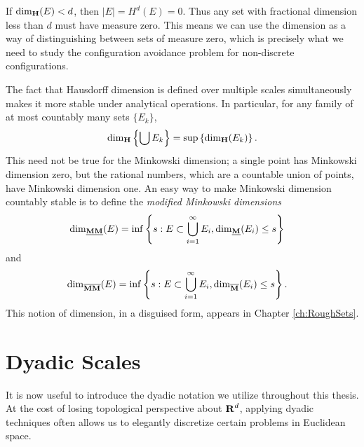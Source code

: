 \begin{remark}
	If $\operatorname{\dim_{\mathbf{H}}}(E) < d$, then $|E| = H^d(E) = 0$. Thus any set with fractional dimension less than $d$ must have measure zero. This means we can use the dimension as a way of distinguishing between sets of measure zero, which is precisely what we need to study the configuration avoidance problem for non-discrete configurations.
\end{remark}

The fact that Hausdorff dimension is defined over multiple scales simultaneously makes it more stable under analytical operations. In particular, for any family of at most countably many sets $\{ E_k \}$,
%
\[ \operatorname{\dim_{\mathbf{H}}} \left\{ \bigcup E_k \right\} = \sup \left\{ \operatorname{\dim_{\mathbf{H}}}(E_k) \right\}. \]
%
This need not be true for the Minkowski dimension; a single point has Minkowski dimension zero, but the rational numbers, which are a countable union of points, have Minkowski dimension one. An easy way to make Minkowski dimension countably stable is to define the \emph{modified Minkowski dimensions}
%
\begin{align*}
	\operatorname{\dim_{\underline{\mathbf{MM}}}}(E) &= \inf \left\{ s : E \subset \bigcup_{i = 1}^\infty E_i, \operatorname{\dim_{\underline{\mathbf{M}}}}(E_i) \leq s \right\}
\end{align*}
%
and
%
\begin{align*}
	\operatorname{\dim_{\overline{\mathbf{MM}}}}(E) &= \inf \left\{ s : E \subset \bigcup_{i = 1}^\infty E_i, \operatorname{\dim_{\overline{\mathbf{M}}}}(E_i) \leq s \right\}.
\end{align*}
%
This notion of dimension, in a disguised form, appears in Chapter \ref{ch:RoughSets}.







\section{Dyadic Scales} \label{sec:Dyadics}

It is now useful to introduce the dyadic notation we utilize throughout this thesis. At the cost of losing topological perspective about $\operatorname{\mathbf{R}}^d$, applying dyadic techniques often allows us to elegantly discretize certain problems in Euclidean space.

